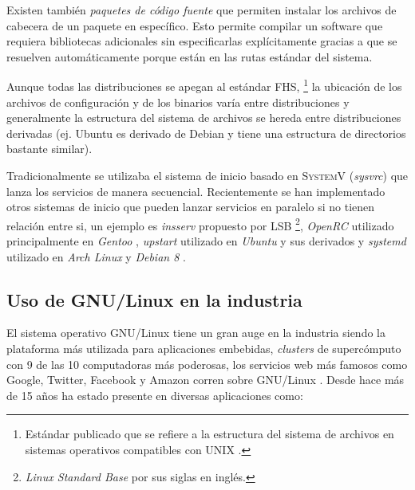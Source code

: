 Existen tambi\'{e}n \textit{paquetes de c\'{o}digo fuente} que permiten instalar los archivos de cabecera de un paquete en espec\'{i}fico. Esto permite compilar un software que requiera bibliotecas adicionales sin especificarlas expl\'{i}citamente gracias a que se resuelven autom\'{a}ticamente porque est\'{a}n en las rutas est\'{a}ndar del sistema.

Aunque todas las distribuciones se apegan al est\'{a}ndar \textsc{FHS}, \cite{_filesystem_????} \footnote{Est\'{a}ndar publicado que se refiere a la estructura del sistema de archivos en sistemas operativos compatibles con \textsc{UNIX} \cite{_fhs_????}.} la ubicaci\'{o}n de los archivos de configuraci\'{o}n y de los binarios var\'{i}a entre distribuciones y generalmente la estructura del sistema de archivos se hereda entre distribuciones derivadas (ej. Ubuntu es derivado de Debian y tiene una estructura de directorios bastante similar).

Tradicionalmente se utilizaba el sistema de inicio basado en \textsc{SystemV} (\textit{sysvrc}) que lanza los servicios de manera secuencial. Recientemente se han implementado otros sistemas de inicio que pueden lanzar servicios en paralelo si no tienen relaci\'{o}n entre si, un ejemplo es \textit{insserv} propuesto por \textsc{LSB} \cite{_lsbinitscripts_????}\cite{_lsbinitscripts/dependencybasedboot_????} \footnote{\textit{Linux Standard Base} por sus siglas en ingl\'{e}s.}, \textit{OpenRC} utilizado principalmente en \textit{Gentoo} \cite{_gentoo_????}\cite{_openrc_????}\cite{_openrc_????-1}, \textit{upstart} utilizado en \textit{Ubuntu} y sus derivados \cite{_upstart_????} y \textit{systemd} utilizado en \textit{Arch Linux} y \textit{Debian 8} \cite{_systemd_????}.


  \subsection {Uso de GNU/Linux en la industria}

El sistema operativo GNU/Linux tiene un gran auge en la industria siendo la plataforma m\'{a}s utilizada para aplicaciones embebidas, \textit{clusters} de superc\'{o}mputo con 9 de las 10 computadoras m\'{a}s poderosas, los servicios web m\'{a}s famosos como Google, Twitter, Facebook y Amazon corren sobre GNU/Linux \cite{_how_????}. Desde hace m\'{a}s de 15 a\~{n}os ha estado presente en diversas aplicaciones como:

